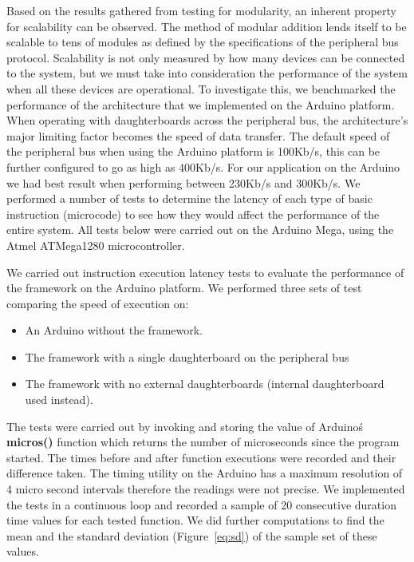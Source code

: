 Based on the results gathered from testing for modularity, an inherent property for scalability can be observed. The method of modular addition lends itself to be scalable to tens of modules as defined by the specifications of the \iic peripheral bus protocol. Scalability is not only measured by how many devices can be connected to the system, but we must take into consideration the performance of the system when all these devices are operational. To investigate this, we benchmarked the performance of the architecture that we implemented on the Arduino platform.  When operating with daughterboards across the peripheral bus, the \xten architecture's major limiting factor becomes the speed of data transfer. The default speed of the \iic peripheral bus when using the Arduino platform is 100Kb/s, this can be further configured to go as high as 400Kb/s. For our application on the Arduino we had best result when performing between 230Kb/s and 300Kb/s. We performed a number of tests to determine the latency of each type of basic instruction (microcode) to see how they would affect the performance of the entire system. All tests below were carried out on the Arduino Mega, using the Atmel \texttrademark ATMega1280 microcontroller.

We carried out instruction execution latency tests to evaluate the performance of the \xten framework on the Arduino platform. We performed three sets of test comparing the speed of execution on:
\begin{itemize}
\item  An Arduino without the \xten framework.
\item The \xten framework with a single daughterboard on the peripheral bus
\item The \xten framework with no external daughterboards (internal daughterboard used instead).
\end{itemize}

The tests were carried out by invoking and storing the value of Arduino\'s \textbf{micros()} function which returns the number of microseconds since the program started. The times before and after function executions were recorded and their difference taken. The timing utility on the Arduino has a maximum resolution of 4 micro second intervals therefore the readings were not precise. We implemented the tests in a continuous loop and recorded a sample of 20 consecutive duration time values for each tested function. We did further computations to find the mean and the standard deviation (Figure~\ref{eq:sd}) of the sample set of these values.

